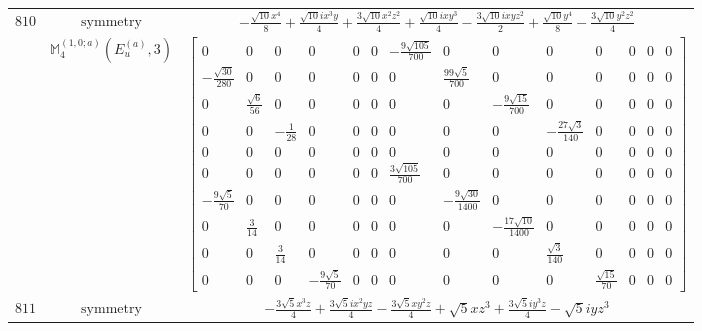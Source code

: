 \documentclass[fleqn,8pt,landscape]{jsarticle}
\begin{document}
\begin{longtable}{ccc}
$ 810 $ & $ \text{symmetry} $ & $ - \frac{\sqrt{10} x^{4}}{8} + \frac{\sqrt{10} i x^{3} y}{4} + \frac{3 \sqrt{10} x^{2} z^{2}}{4} + \frac{\sqrt{10} i x y^{3}}{4} - \frac{3 \sqrt{10} i x y z^{2}}{2} + \frac{\sqrt{10} y^{4}}{8} - \frac{3 \sqrt{10} y^{2} z^{2}}{4} $ \\
$  $ & $ \mathbb{M}_{4}^{(1,0;a)}(E_{u}^{(a)},3) $ & $ \begin{bmatrix} 0 & 0 & 0 & 0 & 0 & 0 & - \frac{9 \sqrt{105}}{700} & 0 & 0 & 0 & 0 & 0 & 0 & 0 \\ - \frac{\sqrt{30}}{280} & 0 & 0 & 0 & 0 & 0 & 0 & \frac{99 \sqrt{5}}{700} & 0 & 0 & 0 & 0 & 0 & 0 \\ 0 & \frac{\sqrt{6}}{56} & 0 & 0 & 0 & 0 & 0 & 0 & - \frac{9 \sqrt{15}}{700} & 0 & 0 & 0 & 0 & 0 \\ 0 & 0 & - \frac{1}{28} & 0 & 0 & 0 & 0 & 0 & 0 & - \frac{27 \sqrt{3}}{140} & 0 & 0 & 0 & 0 \\ 0 & 0 & 0 & 0 & 0 & 0 & 0 & 0 & 0 & 0 & 0 & 0 & 0 & 0 \\ 0 & 0 & 0 & 0 & 0 & 0 & \frac{3 \sqrt{105}}{700} & 0 & 0 & 0 & 0 & 0 & 0 & 0 \\ - \frac{9 \sqrt{5}}{70} & 0 & 0 & 0 & 0 & 0 & 0 & - \frac{9 \sqrt{30}}{1400} & 0 & 0 & 0 & 0 & 0 & 0 \\ 0 & \frac{3}{14} & 0 & 0 & 0 & 0 & 0 & 0 & - \frac{17 \sqrt{10}}{1400} & 0 & 0 & 0 & 0 & 0 \\ 0 & 0 & \frac{3}{14} & 0 & 0 & 0 & 0 & 0 & 0 & \frac{\sqrt{3}}{140} & 0 & 0 & 0 & 0 \\ 0 & 0 & 0 & - \frac{9 \sqrt{5}}{70} & 0 & 0 & 0 & 0 & 0 & 0 & \frac{\sqrt{15}}{70} & 0 & 0 & 0 \end{bmatrix} $ \\ \hline
$ 811 $ & $ \text{symmetry} $ & $ - \frac{3 \sqrt{5} x^{3} z}{4} + \frac{3 \sqrt{5} i x^{2} y z}{4} - \frac{3 \sqrt{5} x y^{2} z}{4} + \sqrt{5} x z^{3} + \frac{3 \sqrt{5} i y^{3} z}{4} - \sqrt{5} i y z^{3} $ \\

\end{longtable}
\end{document}

